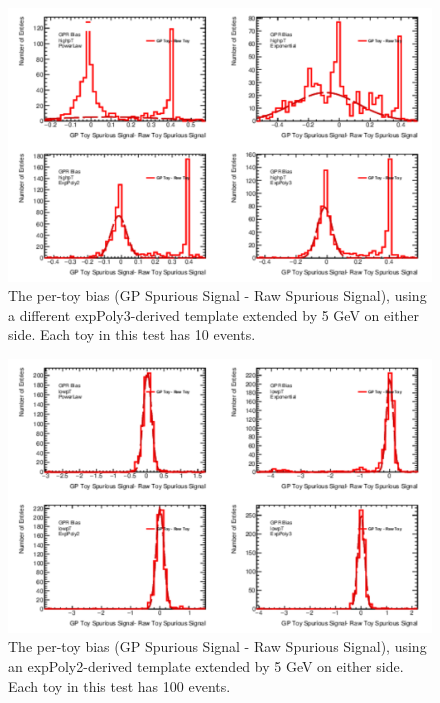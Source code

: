 \begin{figure} 
\begin{center}
  \includegraphics[width=\textwidth]{figures/background/gpr/validation/padded/ToyTest_FitSigBiases_highpT_10_noSig}   
\caption{The per-toy bias (GP Spurious Signal - Raw Spurious Signal), using a different expPoly3-derived template extended by 5 GeV on either side. Each toy in this test has 10 events.}
\label{fig:bias_padded_highpt_10_noSig}
\end{center}
\end{figure}

\begin{figure} 
\begin{center}
  \includegraphics[width=\textwidth]{figures/background/gpr/validation/padded/ToyTest_FitSigBiases_lowpT_100_noSig}   
\caption{The per-toy bias (GP Spurious Signal - Raw Spurious Signal), using an expPoly2-derived template extended by 5 GeV on either side. Each toy in this test has 100 events.}
\label{fig:bias_padded_lowpt_100_noSig}
\end{center}
\end{figure}

